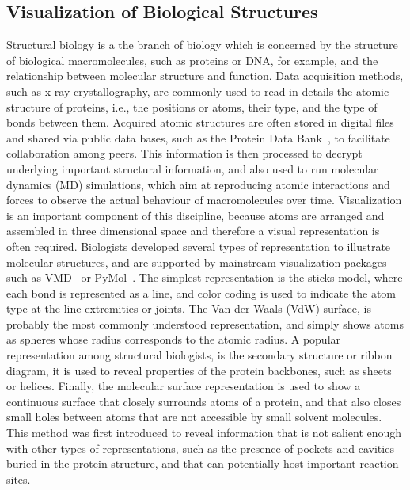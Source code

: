 \subsection{Visualization of Biological Structures}

Structural biology is a the branch of biology which is concerned by the structure of biological macromolecules, such as proteins or DNA, for example, and the relationship between molecular structure and function.
Data acquisition methods, such as x-ray crystallography, are commonly used to read in details the atomic structure of proteins, i.e., the positions or atoms, their type, and the type of bonds between them.
Acquired atomic structures are often stored in digital files and shared via public data bases, such as the Protein Data Bank~\cite{bernstein1977protein}, to facilitate collaboration among peers.
This information is then processed to decrypt underlying important structural information, and also used to run molecular dynamics (MD) simulations, which aim at reproducing atomic interactions and forces to observe the actual behaviour of macromolecules over time.
Visualization is an important component of this discipline, because atoms are arranged and assembled in three dimensional space and therefore a visual representation is often required.
Biologists developed several types of representation to illustrate molecular structures, and are supported by mainstream visualization packages such as VMD~\cite{humphrey1996vmd} or PyMol~\cite{PyMOL}.
The simplest representation is the sticks model, where each bond is represented as a line, and color coding is used to indicate the atom type at the line extremities or joints.
The Van der Waals (VdW) surface, is probably the most commonly understood representation, and simply shows atoms as spheres whose radius corresponds to the atomic radius.
A popular representation among structural biologists, is the secondary structure or ribbon diagram, it is used to reveal properties of the protein backbones, such as sheets or helices.
Finally, the molecular surface representation is used to show a continuous surface that closely surrounds atoms of a protein, and that also closes small holes between atoms that are not accessible by small solvent molecules.
This method was first introduced to reveal information that is not salient enough with other types of representations, such as the presence of pockets and cavities buried in the protein structure, and that can potentially host important reaction sites.

